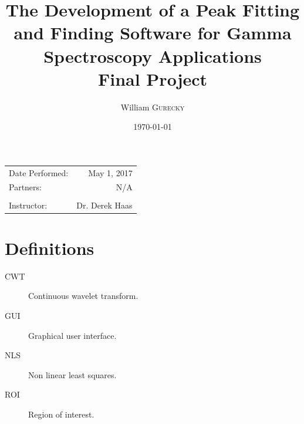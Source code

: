 \documentclass[10pt]{article}
\title{The Development of a Peak Fitting and Finding Software for Gamma Spectroscopy Applications \\
\bigskip \large Final Project} %
\author{William \textsc{Gurecky}} %
\date{\today} %
\begin{document}
\maketitle %

\begin{center}
\begin{tabular}{l r}
Date Performed: & May 1, 2017 \\ %
Partners: &  N/A \\ %
&  \\
Instructor: & Dr.  Derek Haas %
\end{tabular}
\end{center}
\tableofcontents



\pagebreak
\section*{Definitions}
\label{definitions}
\begin{description}

\item[CWT]  Continuous wavelet transform.
\item[GUI]  Graphical user interface.
\item[NLS]  Non linear least squares.
\item[ROI]  Region of interest.

\end{description}

\end{document}
